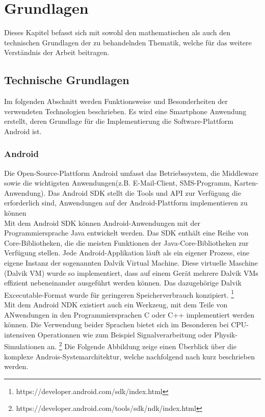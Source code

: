 \chapter{\label{chap:grundlagen}Grundlagen}
Dieses Kapitel befasst sich mit sowohl den mathematischen als auch den technischen Grundlagen der zu behandelnden Thematik, welche für das weitere Verständnis der Arbeit beitragen.
\section{\label{sec:technGrundlagen}Technische Grundlagen}
Im folgenden Abschnitt werden Funktionsweise und Besonderheiten der verwendeten Technologien beschrieben. Es wird eine Smartphone Anwendung erstellt, deren Grundlage für die Implementierung die Software-Plattform Android ist.
\subsection{Android}
Die Open-Source-Plattform Android umfasst das Betriebssystem, die Middleware sowie die wichtigsten Anwendungen(z.B. E-Mail-Client, SMS-Programm, Karten-Anwendung). Das Android \gls{SDK} stellt die Tools und \gls{API} zur Verfügung die erforderlich sind, Anwendungen auf der Android-Plattform implementieren zu können \cite{androidwww}\\
Mit dem Android \gls{SDK} können Android-Anwendungen mit der Programmiersprache Java entwickelt werden. Das \gls{SDK} enthält eine Reihe von Core-Bibliotheken, die die meisten Funktionen der Java-Core-Bibliotheken zur Verfügung stellen. Jede Android-Applikation läuft als ein eigener Prozess, eine eigene Instanz der sogenannten Dalvik Virtual Machine. Diese virtuelle Maschine (Dalvik VM) wurde so implementiert, dass auf einem Gerät mehrere Dalvik VMs effizient nebeneinander ausgeführt werden können. Das dazugehörige Dalvik Excecutable-Format wurde für geringeren Speicherverbrauch konzipiert. \footnote{https://developer.android.com/sdk/index.html}\cite{androidwww} \\ 
Mit dem Android \gls{NDK} existiert auch ein Werkzeug, mit dem Teile von ANwendungen in den Programmiersprachen C oder C++ implementiert werden können. Die Verwendung beider Sprachen bietet sich im Besonderen bei CPU-intensiven Operationnen wie zum Beispiel Signalverarbeitung oder Physik-Simulationen an. \footnote{https://developer.android.com/tools/sdk/ndk/index.html}
Die Folgende Abbildung zeige einen Überblick über die komplexe Androis-Systemarchitektur, welche nachfolgend nach \cite{android} kurz beschrieben werden.
